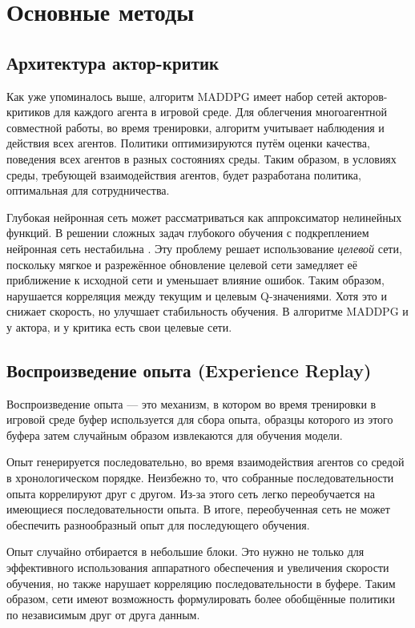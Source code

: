 \section{Основные методы}

\subsection{Архитектура актор-критик}

Как уже упоминалось выше, алгоритм MADDPG имеет набор сетей акторов-критиков для каждого агента в игровой среде. Для облегчения многоагентной совместной работы, во время тренировки, алгоритм учитывает наблюдения и действия всех агентов. Политики оптимизируются путём оценки качества, поведения всех агентов в разных состояниях среды. Таким образом, в условиях среды, требующей взаимодействия агентов, будет разработана политика, оптимальная для сотрудничества.

Глубокая нейронная сеть может рассматриваться как аппроксиматор нелинейных функций. В решении сложных задач глубокого обучения с подкреплением нейронная сеть нестабильна \cite{lillicrap2015continuous}. Эту проблему решает использование \textit{целевой} сети, поскольку мягкое и разрежённое обновление целевой сети замедляет её приближение к исходной сети и уменьшает влияние ошибок. Таким образом, нарушается корреляция между текущим и целевым Q-значениями. Хотя это и снижает скорость, но улучшает стабильность обучения. В алгоритме MADDPG и у актора, и у критика есть свои целевые сети.

\subsection{Воспроизведение опыта (Experience Replay)}

Воспроизведение опыта — это механизм, в котором во время тренировки в игровой среде буфер используется для сбора опыта, образцы которого из этого буфера затем случайным образом извлекаются для обучения модели.

Опыт генерируется последовательно, во время взаимодействия агентов со средой в хронологическом порядке. Неизбежно то, что собранные последовательности опыта коррелируют друг с другом. Из-за этого сеть легко переобучается на имеющиеся последовательности опыта. В итоге, переобученная сеть не может обеспечить разнообразный опыт для последующего обучения.

Опыт случайно отбирается в небольшие блоки. Это нужно не только для эффективного использования аппаратного обеспечения и увеличения скорости обучения, но также нарушает корреляцию последовательности в буфере. Таким образом, сети имеют возможность формулировать более обобщённые политики по независимым друг от друга данным.

